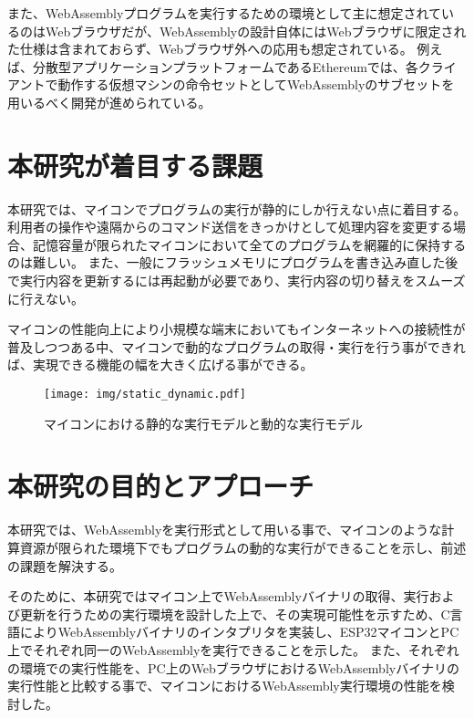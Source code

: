 また、WebAssemblyプログラムを実行するための環境として主に想定されているのはWebブラウザだが、WebAssemblyの設計自体にはWebブラウザに限定された仕様は含まれておらず、Webブラウザ外への応用も想定されている。
例えば、分散型アプリケーションプラットフォームであるEthereumでは、各クライアントで動作する仮想マシンの命令セットとしてWebAssemblyのサブセットを用いるべく開発が進められている\cite{ewasm}。

\section{本研究が着目する課題}

本研究では、マイコンでプログラムの実行が静的にしか行えない点に着目する。
利用者の操作や遠隔からのコマンド送信をきっかけとして処理内容を変更する場合、記憶容量が限られたマイコンにおいて全てのプログラムを網羅的に保持するのは難しい。
また、一般にフラッシュメモリにプログラムを書き込み直した後で実行内容を更新するには再起動が必要であり、実行内容の切り替えをスムーズに行えない。

マイコンの性能向上により小規模な端末においてもインターネットへの接続性が普及しつつある中、マイコンで動的なプログラムの取得・実行を行う事ができれば、実現できる機能の幅を大きく広げる事ができる。

\begin{figure}[htbp]
  \caption{マイコンにおける静的な実行モデルと動的な実行モデル}
  \label{fig:static_dynamic}
  \begin{center}
    \texttt{[image: img/static\_dynamic.pdf]}
  \end{center}
\end{figure}

\section{本研究の目的とアプローチ}

本研究では、WebAssemblyを実行形式として用いる事で、マイコンのような計算資源が限られた環境下でもプログラムの動的な実行ができることを示し、前述の課題を解決する。

そのために、本研究ではマイコン上でWebAssemblyバイナリの取得、実行および更新を行うための実行環境を設計した上で、その実現可能性を示すため、C言語によりWebAssemblyバイナリのインタプリタを実装し、ESP32マイコンとPC上でそれぞれ同一のWebAssemblyを実行できることを示した。
また、それぞれの環境での実行性能を、PC上のWebブラウザにおけるWebAssemblyバイナリの実行性能と比較する事で、マイコンにおけるWebAssembly実行環境の性能を検討した。

